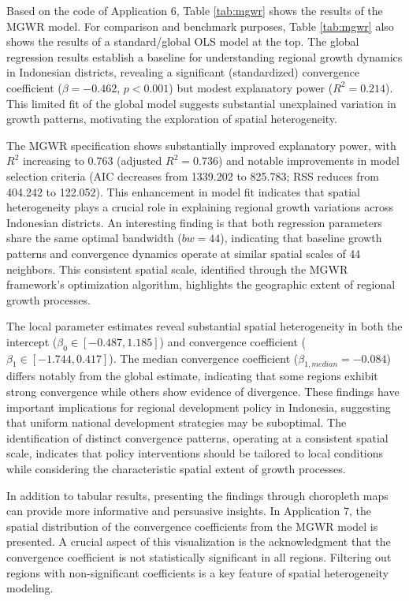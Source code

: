\documentclass[smallextended, natbib]{svjour3}       %
\begin{document}
Based on the code of Application 6, Table \ref{tab:mgwr} shows the results of the MGWR model. 
For comparison and benchmark purposes, Table \ref{tab:mgwr} also shows the results of a standard/global OLS model at the top. 
The global regression results establish a baseline for understanding regional growth dynamics in Indonesian districts, revealing a significant (standardized) convergence coefficient ($\beta = -0.462$, $p<0.001$) but modest explanatory power ($R^2 = 0.214$). 
This limited fit of the global model suggests substantial unexplained variation in growth patterns, motivating the exploration of spatial heterogeneity.

The MGWR specification shows substantially improved explanatory power, with $R^2$ increasing to 0.763 (adjusted $R^2 = 0.736$) and notable improvements in model selection criteria (AIC decreases from 1339.202 to 825.783; RSS reduces from 404.242 to 122.052). 
This enhancement in model fit indicates that spatial heterogeneity plays a crucial role in explaining regional growth variations across Indonesian districts.
An interesting finding is that both regression parameters share the same optimal bandwidth ($bw = 44$), indicating that baseline growth patterns and convergence dynamics operate at similar spatial scales of 44 neighbors. 
This consistent spatial scale, identified through the MGWR framework's optimization algorithm, highlights the geographic extent of regional growth processes. 


The local parameter estimates reveal substantial spatial heterogeneity in both the intercept ($\beta_0 \in [-0.487, 1.185]$) and convergence coefficient ($\beta_1 \in [-1.744, 0.417]$). 
The median convergence coefficient ($\beta_{1,median} = -0.084$) differs notably from the global estimate, indicating that some regions exhibit strong convergence while others show evidence of divergence. 
These findings have important implications for regional development policy in Indonesia, suggesting that uniform national development strategies may be suboptimal. 
The identification of distinct convergence patterns, operating at a consistent spatial scale, indicates that policy interventions should be tailored to local conditions while considering the characteristic spatial extent of growth processes.


In addition to tabular results, presenting the findings through choropleth maps can provide more informative and persuasive insights.
In Application 7, the spatial distribution of the convergence coefficients from the MGWR model is presented.
A crucial aspect of this visualization is the acknowledgment that the convergence coefficient is not statistically significant in all regions.
Filtering out regions with non-significant coefficients is a key feature of spatial heterogeneity modeling.
\end{document}
